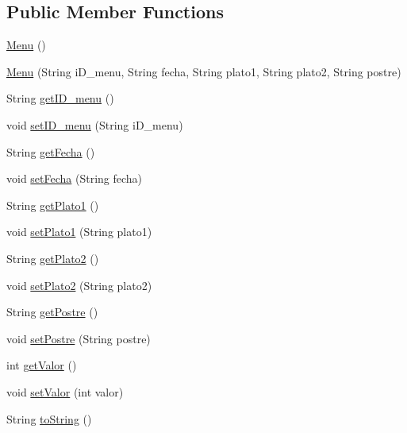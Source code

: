 \subsection*{Public Member Functions}
\begin{DoxyCompactItemize}
\item 
\mbox{\hyperlink{classes_1_1deusto_1_1spq_1_1biblioteca_1_1data_1_1_menu_ae722e2f74e82b788327d4d16c2c5f622}{Menu}} ()
\item 
\mbox{\hyperlink{classes_1_1deusto_1_1spq_1_1biblioteca_1_1data_1_1_menu_a7068e200f4cd399db4c1a29ca895dae0}{Menu}} (String i\+D\+\_\+menu, String fecha, String plato1, String plato2, String postre)
\item 
String \mbox{\hyperlink{classes_1_1deusto_1_1spq_1_1biblioteca_1_1data_1_1_menu_ad0546e8f7f5a022b6de889d97a0bb2bb}{get\+I\+D\+\_\+menu}} ()
\item 
void \mbox{\hyperlink{classes_1_1deusto_1_1spq_1_1biblioteca_1_1data_1_1_menu_abee8ad0d3b4899f908d0e8e2f4a17a93}{set\+I\+D\+\_\+menu}} (String i\+D\+\_\+menu)
\item 
String \mbox{\hyperlink{classes_1_1deusto_1_1spq_1_1biblioteca_1_1data_1_1_menu_a3e3810455310f452d51a7655e742b97a}{get\+Fecha}} ()
\item 
void \mbox{\hyperlink{classes_1_1deusto_1_1spq_1_1biblioteca_1_1data_1_1_menu_a20710b26e7385cdbbd85b83209c52672}{set\+Fecha}} (String fecha)
\item 
String \mbox{\hyperlink{classes_1_1deusto_1_1spq_1_1biblioteca_1_1data_1_1_menu_a6321a079ece24e42ed984989a39c3b40}{get\+Plato1}} ()
\item 
void \mbox{\hyperlink{classes_1_1deusto_1_1spq_1_1biblioteca_1_1data_1_1_menu_a1f3725a75f93797b85d4c10c706a5483}{set\+Plato1}} (String plato1)
\item 
String \mbox{\hyperlink{classes_1_1deusto_1_1spq_1_1biblioteca_1_1data_1_1_menu_aa8e902ae29177a34bc606f240ab43000}{get\+Plato2}} ()
\item 
void \mbox{\hyperlink{classes_1_1deusto_1_1spq_1_1biblioteca_1_1data_1_1_menu_a2e9de7f2d24912d5f761400955517de7}{set\+Plato2}} (String plato2)
\item 
String \mbox{\hyperlink{classes_1_1deusto_1_1spq_1_1biblioteca_1_1data_1_1_menu_a33cfb2da0909a53f6cce31feea0b830d}{get\+Postre}} ()
\item 
void \mbox{\hyperlink{classes_1_1deusto_1_1spq_1_1biblioteca_1_1data_1_1_menu_aaf92b828e27af7532b98c9cc10ff2abf}{set\+Postre}} (String postre)
\item 
int \mbox{\hyperlink{classes_1_1deusto_1_1spq_1_1biblioteca_1_1data_1_1_menu_ada5250d5f5f1f4d237c3b1ecb9ab523d}{get\+Valor}} ()
\item 
void \mbox{\hyperlink{classes_1_1deusto_1_1spq_1_1biblioteca_1_1data_1_1_menu_a1918143b18cc040ed18aa5a3b367534c}{set\+Valor}} (int valor)
\item 
String \mbox{\hyperlink{classes_1_1deusto_1_1spq_1_1biblioteca_1_1data_1_1_menu_a3385f0a3f0088252e92ba4ec820b7649}{to\+String}} ()
\end{DoxyCompactItemize}


